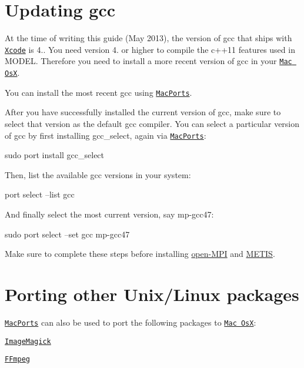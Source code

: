 \hypertarget{macosx_macosxGCC}{}\section{Updating gcc}\label{macosx_macosxGCC}
At the time of writing this guide (May 2013), the version of gcc that ships with \href{https://developer.apple.com/xcode/}{\tt Xcode} is 4.. You need version 4. or higher to compile the c++11 features used in M\+O\+D\+E\+L. Therefore you need to install a more recent version of gcc in your \href{http://www.apple.com/osx/}{\tt Mac Os\+X}.

You can install the most recent gcc using \href{http://www.macports.org}{\tt Mac\+Ports}.

After you have successfully installed the current version of gcc, make sure to select that version as the default gcc compiler. You can select a particular version of gcc by first installing gcc\+\_\+select, again via \href{http://www.macports.org}{\tt Mac\+Ports}\+: \begin{DoxyVerb}sudo port install gcc_select
\end{DoxyVerb}
 Then, list the available gcc versions in your system\+: \begin{DoxyVerb}port select --list gcc
\end{DoxyVerb}
 And finally select the most current version, say mp-\/gcc47\+: \begin{DoxyVerb}sudo port select --set gcc mp-gcc47
\end{DoxyVerb}


Make sure to complete these steps before installing \hyperlink{openmpi}{open-\/\+M\+P\+I} and \hyperlink{metis}{M\+E\+T\+I\+S}.\hypertarget{macosx_macosxPorting}{}\section{Porting other Unix/\+Linux packages}\label{macosx_macosxPorting}
\href{http://www.macports.org}{\tt Mac\+Ports} can also be used to port the following packages to \href{http://www.apple.com/osx/}{\tt Mac Os\+X}\+:
\begin{DoxyItemize}
\item \href{http://www.imagemagick.org}{\tt Image\+Magick}
\item \href{http://www.ffmpeg.org}{\tt F\+Fmpeg} 
\end{DoxyItemize}
